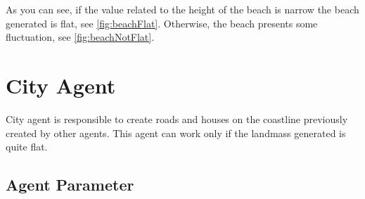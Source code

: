 \documentclass[12pt]{article}
\begin{document}
    As you can see, if the value related to the height of the beach is narrow the beach generated is flat, see \ref{fig:beachFlat}. Otherwise, the beach presents
    some fluctuation, see \ref{fig:beachNotFlat}.

    \newpage

    \section{City Agent}
    City agent is responsible to create roads and houses on the coastline previously created by other agents. This agent can work only if the landmass generated
    is quite flat. 

    \subsection{Agent Parameter}
\end{document}
